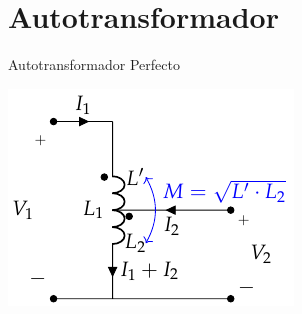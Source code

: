 \documentclass[xcolor={usenames,svgnames,dvipsnames}]{beamer}
\begin{document}
\section{Autotransformador}
\label{sec:org55f6364}
\begin{frame}[label={sec:orgbec2e6e}]{Autotransformador Perfecto}
\begin{center}
\includegraphics[height=0.9\textheight]{../figs/AutotrafoPerfecto.pdf}
\end{center}
\end{frame}
\end{document}
